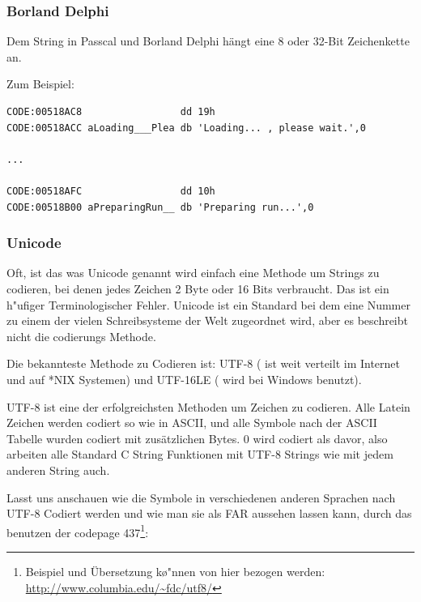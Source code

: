 
\subsubsection{Borland Delphi}

Dem String in Passcal und Borland Delphi h\"angt eine 8 oder 32-Bit Zeichenkette an. 

Zum Beispiel:

\begin{lstlisting}[caption=Delphi,style=customasmx86]
CODE:00518AC8                 dd 19h
CODE:00518ACC aLoading___Plea db 'Loading... , please wait.',0

...

CODE:00518AFC                 dd 10h
CODE:00518B00 aPreparingRun__ db 'Preparing run...',0
\end{lstlisting}

\subsubsection{Unicode}


Oft, ist das was Unicode genannt wird einfach eine Methode um Strings zu codieren, bei denen jedes Zeichen 2 Byte oder 
16 Bits verbraucht. Das ist ein h\a"ufiger Terminologischer Fehler. Unicode ist ein Standard bei dem eine Nummer 
zu einem der vielen Schreibsysteme der Welt zugeordnet wird, aber es beschreibt nicht die codierungs Methode. 


Die bekannteste Methode zu Codieren ist: UTF-8 ( ist weit verteilt im Internet und auf *NIX Systemen) und UTF-16LE ( wird bei Windows benutzt). 


UTF-8 ist eine der erfolgreichsten Methoden um Zeichen zu codieren.
Alle Latein Zeichen werden codiert so wie in ASCII, und alle Symbole nach der
ASCII Tabelle wurden codiert mit zus\"atzlichen Bytes. 0 wird codiert als davor,
also arbeiten alle Standard C String Funktionen mit UTF-8 Strings wie mit jedem anderen String auch.

Lasst uns anschauen wie die Symbole in verschiedenen anderen Sprachen nach UTF-8 Codiert werden und 
wie man sie als FAR aussehen lassen kann, durch das benutzen der codepage 437\footnote{Beispiel und \"Ubersetzung k\o"nnen von hier bezogen werden:  
\url{http://www.columbia.edu/~fdc/utf8/}}:

